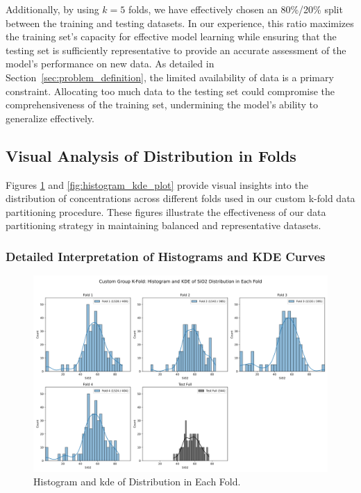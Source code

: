 Additionally, by using $k=5$ folds, we have effectively chosen an 80\%/20\% split between the training and testing datasets.
In our experience, this ratio maximizes the training set's capacity for effective model learning while ensuring that the testing set is sufficiently representative to provide an accurate assessment of the model's performance on new data.
As detailed in Section~\ref{sec:problem_definition}, the limited availability of data is a primary constraint.
Allocating too much data to the testing set could compromise the comprehensiveness of the training set, undermining the model's ability to generalize effectively.

\subsection{Visual Analysis of  Distribution in Folds}

Figures \ref{fig:histogram_grid_plot} and \ref{fig:histogram_kde_plot} provide visual insights into the distribution of  concentrations across different folds used in our custom k-fold data partitioning procedure.
These figures illustrate the effectiveness of our data partitioning strategy in maintaining balanced and representative datasets.

\subsubsection{Detailed Interpretation of Histograms and KDE Curves}

\begin{figure}[h!]
    \centering
    \includegraphics[width=\textwidth]{images/histogram_grid_plot.png}
    \caption{Histogram and \gls{kde} of  Distribution in Each Fold.}
    \label{fig:histogram_grid_plot}
\end{figure}


